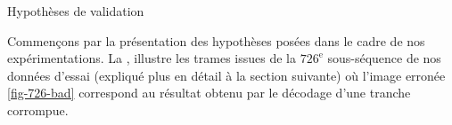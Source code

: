 \begin{section}{Hypothèses de validation}
\label{sec-Hypotheses-validation}

Commençons par la présentation des hypothèses posées dans le cadre de nos
expérimentations. La , illustre les trames issues de la
$726^{\text{e}}$ sous-séquence de nos données d'essai (expliqué plus en détail à
la section suivante) où l'image erronée \ref{fig-726-bad} correspond au
résultat obtenu par le décodage d'une tranche corrompue.

\begin{figure}
\end{figure}
\end{section}
